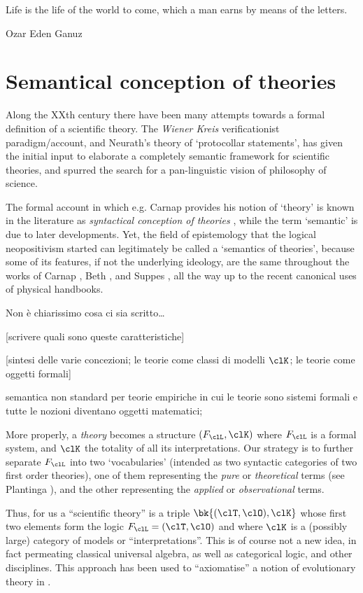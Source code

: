 \epigraph{Life is the life of the world to come, which a man earns by means of the letters.}{Ozar Eden Ganuz}
\section{Semantical conception of theories}
Along the XXth century there have been many attempts towards a formal definition of a scientific theory. The \emph{Wiener Kreis} verificationist paradigm/account, and Neurath's theory of `protocollar statements', has given the initial input to elaborate a completely semantic framework for scientific theories, and spurred the search for a pan-linguistic vision of philosophy of science.

The formal account in which e.g. Carnap \cite{carnap56} provides his notion of `theory' is known in the literature as \emph{syntactical conception of theories} \cite{?}, while the term `semantic' is due to later developments. Yet, the field of epistemology that the logical neopositivism started can legitimately be called a `semantics of theories', because some of its features, if not the underlying ideology, are the same throughout the works of Carnap \cite{carnap56,carnapfound,carnap1956meaning},  Beth \cite{?}, and Suppes \cite{suppes2002representation}, all the way up to the recent canonical uses of physical handbooks.

{\color{red} Non è chiarissimo cosa ci sia scritto\dots}

	[scrivere quali sono queste caratteristiche]

	[sintesi delle varie concezioni; le teorie come classi di modelli $\clK$;
		le teorie come oggetti formali]

semantica non standard per teorie empiriche in cui le teorie sono sistemi formali e tutte le nozioni diventano oggetti matematici; 

More properly, a \emph{theory} becomes a structure $(F_\clL, \clK)$ where $F_\clL$ is a formal system, and $\clK$ the totality of all its interpretations. Our strategy is to further separate $F_\clL$ into two `vocabularies' (intended as two syntactic categories of two first order theories), one of them representing the \emph{pure} or \emph{theoretical} terms (see Plantinga \cite{?}), and the other representing the \emph{applied} or \emph{observational} terms. 

Thus, for us a ``scientific theory'' is a triple $\bk{(\clT,\clO), \clK}$ whose first two elements form the logic $F_\clL=(\clT,\clO)$ and where $\clK$ is a (possibly large) category of models or ``interpretations''. This is of course not a new idea, in fact permeating classical universal algebra, as well as categorical logic, and other disciplines. This approach has been used to ``axiomatise'' a notion of evolutionary theory in \cite{biologia}.

